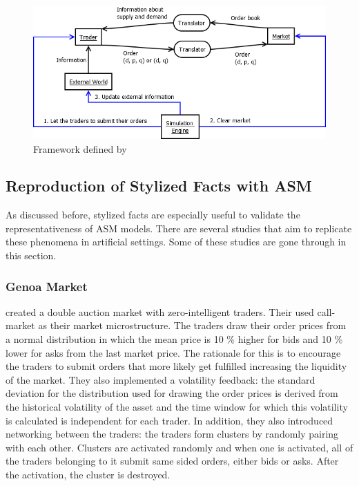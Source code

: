 \begin{figure}
    \includegraphics[width=\linewidth]{diagrams/julien_market.png}
    \caption{Framework defined by \citet{Julien07}}
\end{figure}


\subsection{Reproduction of Stylized Facts with ASM}
As discussed before, stylized facts are especially useful
to validate the representativeness of ASM models. There are several 
studies that aim to replicate these phenomena in 
artificial settings. Some of these studies are
gone through in this section.
% 
\subsubsection{Genoa Market}

\citet{Genoa01} created a double auction market with zero-intelligent 
traders. Their used call-market as their market microstructure. The traders draw their 
order prices from a normal distribution in which the mean price is 10 \%
higher for bids and 10 \% lower for asks from the last market price. The
rationale for this is to encourage the traders to submit orders that more likely get 
fulfilled increasing the liquidity of the market.
They also implemented a volatility feedback: the standard deviation for 
the distribution used for drawing the order prices is derived from the 
historical volatility of the asset and the time window for which this
volatility is calculated is independent for each trader. In addition,
they also introduced networking between the traders: the traders
form clusters by randomly pairing with each other. Clusters are activated
randomly and when one is activated, all of the traders belonging to it
submit same sided orders, either bids or asks. After the activation, the cluster is destroyed.

